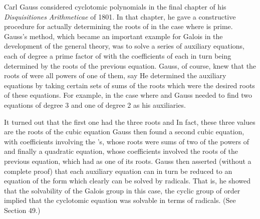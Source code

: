 \documentclass[11pt,oneside]{article}
\begin{document}
\begin{BookBody}


\noindent Carl Gauss considered cyclotomic polynomials in the final chapter of his\textit{ Disquisitiones} \textit{Arithmeticae} of 1801. In that chapter, he gave a constructive procedure for actually determining the roots of  in the case where  is prime. Gauss’s method, which became an important example for Galois in the development of the general theory, was to solve a series of auxiliary equations, each of degree a prime factor of  with the coefficients of each in turn being determined by the roots of the previous equation. Gauss, of course, knew that the roots of  were all powers of one of them, say  He determined the auxiliary equations by taking certain sets of sums of the roots  which were the desired roots of these equations. For example, in the case where and   Gauss needed to find two equations of degree 3 and one of degree 2 as his auxiliaries.

It turned out that the first one had the three roots  and   In fact, these three values are the roots of the cubic equation   Gauss then found a second cubic equation, with coefficients involving the \BookInline{\alpha }’s, whose roots were sums of two of the powers of \BookInline{\zeta,\allowbreak } and finally a quadratic equation, whose coefficients involved the roots of the previous equation, which had \BookInline{\zeta } as one of its roots. Gauss then asserted (without a complete proof) that each auxiliary equation can in turn be reduced to an equation of the form  which clearly can be solved by radicals. That is, he showed that the solvability of the Galois group in this case, the cyclic group of order  implied that the cyclotomic equation was solvable in terms of radicals. (See Section 49.)


\end{BookBody}
\end{document}
